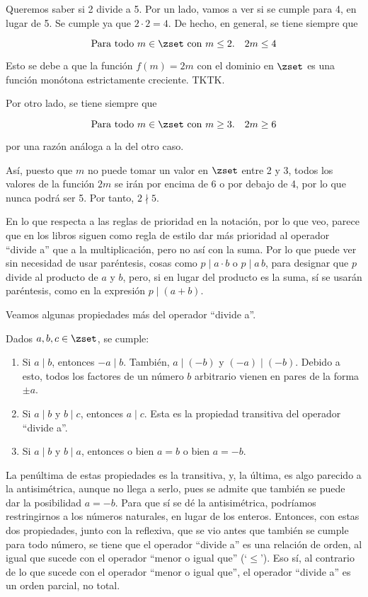 Queremos saber si 2 divide a 5. Por un lado, vamos a ver si se cumple para
4, en lugar de 5. Se cumple ya que $2 \cdot 2 = 4$. De hecho, en general, se
tiene siempre que

$$ \text{Para todo $m \in \zset$ con $m \leq 2$}. \quad 2m \leq 4 $$

\noindent Esto se debe a que la función $f(m) = 2m$ con el dominio en
$\zset$ es una función monótona estrictamente creciente. TKTK.

Por otro lado, se tiene siempre que

$$ \text{Para todo $m \in \zset$ con $m \geq 3$}. \quad 2m \geq 6 $$

\noindent por una razón análoga a la del otro caso.

Así, puesto que $m$ no puede tomar un valor en $\zset$ entre 2 y 3, todos
los valores de la función $2m$ se irán por encima de 6 o por debajo de 4,
por lo que nunca podrá ser 5. Por tanto, $2 \nmid 5$.

En lo que respecta a las reglas de prioridad en la notación, por lo que veo,
parece que en los libros siguen como regla de estilo dar más prioridad al
operador ``divide a'' que a la multiplicación, pero no así con la suma. Por
lo que puede ver sin necesidad de usar paréntesis, cosas como $p \mid a
\cdot b$ o $p \mid a \, b$, para designar que $p$ divide al producto de $a$
y $b$, pero, si en lugar del producto es la suma, sí se usarán paréntesis,
como en la expresión $p \mid (a + b)$.

Veamos algunas propiedades más del operador ``divide a''.

\begin{properties}\label{propi-divide-2}
  Dados $a, b, c \in \zset$, se cumple:

  \begin{enumerate}
    \item Si $a \mid b$, entonces ${-a} \mid b$. También, $a \mid ({-b})$ y
      $({-a}) \mid ({-b})$. Debido a esto, todos los factores de un número
      $b$ arbitrario vienen en pares de la forma ${\pm a}$.
    \item Si $a \mid b$ y $b \mid c$, entonces $a \mid c$. Esta es la
      propiedad transitiva del operador ``divide a''.
    \item Si $a \mid b$ y $b \mid a$, entonces o bien $a = b$ o bien $a =
      {-b}$.
  \end{enumerate}
\end{properties}

La penúltima de estas propiedades es la transitiva, y, la última, es algo
parecido a la antisimétrica, aunque no llega a serlo, pues se admite que
también se puede dar la posibilidad $a = {-b}$. Para que sí se dé la
antisimétrica, podríamos restringirnos a los números naturales, en lugar de
los enteros. Entonces, con estas dos propiedades, junto con la reflexiva,
que se vio antes que también se cumple para todo número, se tiene que el
operador ``divide a'' es una relación de orden, al igual que sucede con el
operador ``menor o igual que'' (`$\leq$'). Eso sí, al contrario de lo que
sucede con el operador ``menor o igual que'', el operador ``divide a'' es un
orden parcial, no total.

